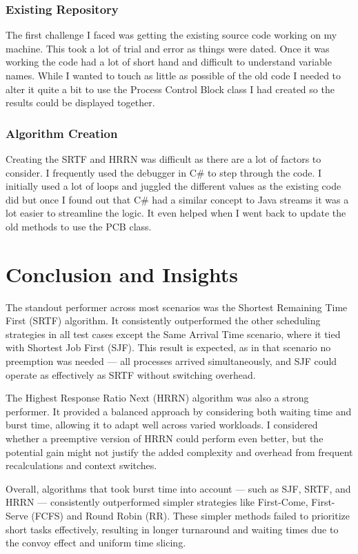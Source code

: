 \documentclass[conference]{report}
\begin{document}
\subsection*{Existing Repository}
The first challenge I faced was getting the existing source code working on my machine. This took a lot of trial and error as things were dated. Once it was working the code had a lot of short hand and difficult to understand variable names. While I wanted to touch as little as possible of the old code I needed to alter it quite a bit to use the Process Control Block class I had created so the results could be displayed together.

\subsection*{Algorithm Creation}
Creating the SRTF and HRRN was difficult as there are a lot of factors to consider. I frequently used the debugger in C\# to step through the code. I initially used a lot of loops and juggled the different values as the existing code did but once I found out that C\# had a similar concept to Java streams it was a lot easier to streamline the logic. It even helped when I went back to update the old methods to use the PCB class. 

\chapter{Conclusion and Insights}
The standout performer across most scenarios was the Shortest Remaining Time First (SRTF) algorithm. It consistently outperformed the other scheduling strategies in all test cases except the Same Arrival Time scenario, where it tied with Shortest Job First (SJF). This result is expected, as in that scenario no preemption was needed — all processes arrived simultaneously, and SJF could operate as effectively as SRTF without switching overhead.

The Highest Response Ratio Next (HRRN) algorithm was also a strong performer. It provided a balanced approach by considering both waiting time and burst time, allowing it to adapt well across varied workloads. I considered whether a preemptive version of HRRN could perform even better, but the potential gain might not justify the added complexity and overhead from frequent recalculations and context switches.

Overall, algorithms that took burst time into account — such as SJF, SRTF, and HRRN — consistently outperformed simpler strategies like First-Come, First-Serve (FCFS) and Round Robin (RR). These simpler methods failed to prioritize short tasks effectively, resulting in longer turnaround and waiting times due to the convoy effect and uniform time slicing.
\end{document}
